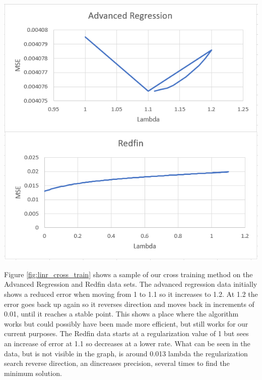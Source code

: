 \documentclass[10pt]{article}
\begin{document}
\begin{multicols}{2}
\begin{center}
			\includegraphics[scale=0.60]{Images/LinearRegressionCrossTrain} \\
			\label{fig:linr_cross_train}
		\end{center}
		\par
                Figure \ref{fig:linr_cross_train} shows a sample of our cross training method on the Advanced Regression and Redfin data sets. The advanced regression data initially shows a reduced error when moving from 1 to 1.1 so it increases to 1.2.  At 1.2 the error goes back up again so it reverses direction and moves back in increments of 0.01, until it reaches a stable point. This shows a place where the algorithm works but could possibly have been made more efficient, but still works for our current purposes. The Redfin data starts at a regularization value of 1 but sees an increase of error at 1.1 so decreases at a lower rate. What can be seen in the data, but is not visible in the graph, is around 0.013 lambda the regularization search reverse direction, an dincreases precision, several times to find the minimum solution.
		\par

\end{multicols}
\end{document}
